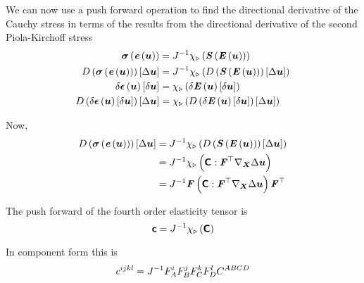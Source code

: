 We can now use a push forward operation to find the directional derivative of the
Cauchy stress in terms of the results from the directional derivative of the second
Piola-Kirchoff stress \ie
\begin{equation}
  \begin{split}
    \fnof{\tensor{\sigma}}{\fnof{\tensor{e}}{\vectr{u}}}&=
    \inverse{J}\pushforward{\chi}{\pbrac{\fnof{\tensor{S}}{\fnof{\tensor{E}}{\vectr{u}}}}}\\
    \directionalderiv{}{\fnof{\tensor{\sigma}}{\fnof{\tensor{e}}{\vectr{u}}}}{\linearisationdir{\vectr{u}}}&=
    \inverse{J}\pushforward{\chi}{\pbrac{\directionalderiv{}{\fnof{\tensor{S}}{\fnof{\tensor{E}}{\vectr{u}}}}{\linearisationdir{\vectr{u}}}}}\\
    \variation{\fnof{\tensor{\epsilon}}{\vectr{u}}}{\vectr{u}}&=\pushforward{\chi}{\pbrac{\variation{\fnof{\tensor{E}}{\vectr{u}}}{\vectr{u}}}} \\
    \directionalderiv{}{\variation{\fnof{\tensor{\epsilon}}{\vectr{u}}}{\vectr{u}}}{\linearisationdir{\vectr{u}}}&=
    \pushforward{\chi}{\pbrac{\directionalderiv{}{\variation{\fnof{\tensor{E}}{\vectr{u}}}{\vectr{u}}}{\linearisationdir{\vectr{u}}}}}
  \end{split}
\end{equation}

Now,
\begin{equation}
  \begin{split}
    \directionalderiv{}{\fnof{\tensor{\sigma}}{\fnof{\tensor{e}}{\vectr{u}}}}{\linearisationdir{\vectr{u}}}&=
    \inverse{J}\pushforward{\chi}{\pbrac{\directionalderiv{}{\fnof{\tensor{S}}{\fnof{\tensor{E}}{\vectr{u}}}}{\linearisationdir{\vectr{u}}}}}\\
    &=\inverse{J}\pushforward{\chi}{\pbrac{\doubledotprod{\tensorfour{C}}{\transpose{\tensortwo{F}}\gradient{\vectr{X}}{\linearisationdir{\vectr{u}}}}}}\\
    &=\inverse{J}\tensor{F}\pbrac{\doubledotprod{\tensorfour{C}}{\transpose{\tensortwo{F}}\gradient{\vectr{X}}{\linearisationdir{\vectr{u}}}}}\transpose{\tensor{F}}
  \end{split}
\end{equation}

The push forward of the fourth order elasticity tensor is
\begin{equation}
  \boldsymbol{\mathsf{c}}={J}^{-1} \chi_{\triangleright}\left( \boldsymbol{\mathsf{C}} \right) 
\end{equation}

In component form this is
\begin{equation}
  c^{ijkl}={J}^{-1}F^{i}_{A}F^{j}_{B}F^{k}_{C}F^{l}_{D}C^{ABCD}
\end{equation}

